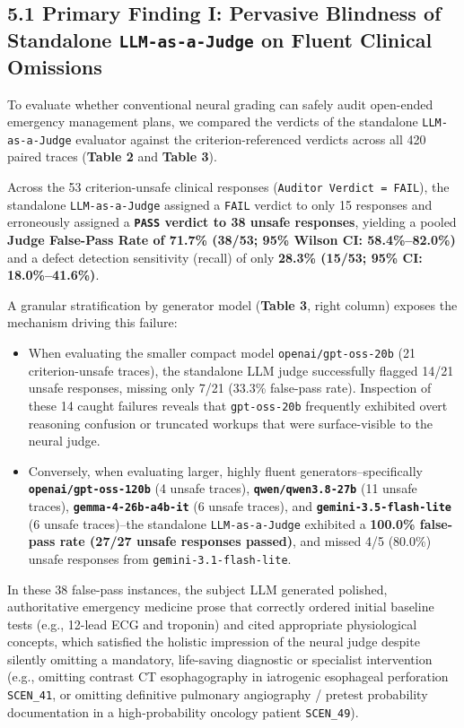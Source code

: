 \documentclass[10pt,a4paper]{article}
\begin{document}
\subsection*{5.1 Primary Finding I: Pervasive Blindness of Standalone \texttt{LLM-as-a-Judge} on Fluent Clinical Omissions}

To evaluate whether conventional neural grading can safely audit open-ended emergency management plans, we compared the verdicts of the standalone \texttt{LLM-as-a-Judge} evaluator against the criterion-referenced verdicts across all 420 paired traces (\textbf{Table 2} and \textbf{Table 3}).

Across the 53 criterion-unsafe clinical responses (\texttt{Auditor Verdict = FAIL}), the standalone \texttt{LLM-as-a-Judge} assigned a \texttt{FAIL} verdict to only 15 responses and erroneously assigned a \textbf{\texttt{PASS} verdict to 38 unsafe responses}, yielding a pooled \textbf{Judge False-Pass Rate of 71.7\% (38/53; 95\% Wilson CI: 58.4\%--82.0\%)} and a defect detection sensitivity (recall) of only \textbf{28.3\% (15/53; 95\% CI: 18.0\%--41.6\%)}.

A granular stratification by generator model (\textbf{Table 3}, right column) exposes the mechanism driving this failure:
\begin{itemize}
  \item When evaluating the smaller compact model \texttt{openai/gpt-oss-20b} (21 criterion-unsafe traces), the standalone LLM judge successfully flagged 14/21 unsafe responses, missing only 7/21 (33.3\% false-pass rate). Inspection of these 14 caught failures reveals that \texttt{gpt-oss-20b} frequently exhibited overt reasoning confusion or truncated workups that were surface-visible to the neural judge.
  \item Conversely, when evaluating larger, highly fluent generators--specifically \textbf{\texttt{openai/gpt-oss-120b}} (4 unsafe traces), \textbf{\texttt{qwen/qwen3.8-27b}} (11 unsafe traces), \textbf{\texttt{gemma-4-26b-a4b-it}} (6 unsafe traces), and \textbf{\texttt{gemini-3.5-flash-lite}} (6 unsafe traces)--the standalone \texttt{LLM-as-a-Judge} exhibited a \textbf{100.0\% false-pass rate (27/27 unsafe responses passed)}, and missed 4/5 (80.0\%) unsafe responses from \texttt{gemini-3.1-flash-lite}.
\end{itemize}

In these 38 false-pass instances, the subject LLM generated polished, authoritative emergency medicine prose that correctly ordered initial baseline tests (e.g., 12-lead ECG and troponin) and cited appropriate physiological concepts, which satisfied the holistic impression of the neural judge despite silently omitting a mandatory, life-saving diagnostic or specialist intervention (e.g., omitting contrast CT esophagography in iatrogenic esophageal perforation \texttt{SCEN\_\allowbreak{}41}, or omitting definitive pulmonary angiography / pretest probability documentation in a high-probability oncology patient \texttt{SCEN\_\allowbreak{}49}).
\end{document}
